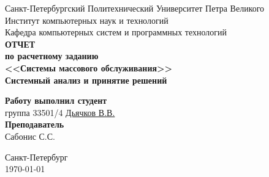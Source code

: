 \begin{titlepage}
\begin{center}
	Санкт-Петербургский Политехнический Университет Петра Великого\\[0.3cm]
	Институт компьютерных наук и технологий \\[0.3cm]
	Кафедра компьютерных систем и программных технологий\\[4cm]
	
	\textbf{ОТЧЕТ}\\ 
	\textbf{по расчетному заданию}\\[0.5cm]
	\textbf{<<Системы массового обслуживания>>}\\[0.1cm]
	\textbf{Системный анализ и принятие решений}\\[4.0cm]
\end{center}

\begin{flushright}
	\begin{minipage}{0.45\textwidth}
		\textbf{Работу выполнил студент}\\[3mm]
		группа 33501/4 \hspace*{6mm} \href{https://github.com/vaddya/system-analysis}{Дьячков В.В.}\\[5mm]
		\textbf{Преподаватель}\\[5mm]
		\sign[3.5cm] \hspace*{5mm} Сабонис С.С. \\[5mm]
	\end{minipage}
\end{flushright}

\vfill

\begin{center}
	Санкт-Петербург\\
	\today
\end{center}
\end{titlepage}

\addtocounter{page}{1}